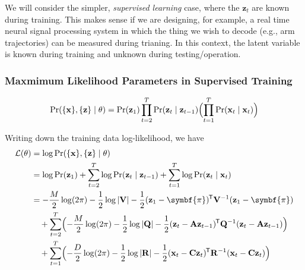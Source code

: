\documentclass[11pt]{article}
\newcommand{\logdet}[1]{\log \left| {#1} \right| }
\newcommand{\xb}{\mathbf{x}}
\newcommand{\zb}{\mathbf{z}}
\newcommand{\Ab}{\mathbf{A}}
\newcommand{\Qb}{\mathbf{Q}}
\newcommand{\Cb}{\mathbf{C}}
\newcommand{\Rb}{\mathbf{R}}
\newcommand*{\tran}{^{\mkern-1.5mu\mathsf{T}}}
\begin{document}
We will consider the simpler, \textit{supervised learning} case, where the
$\zb_t$ are known during training. This makes sense if we are designing, for
example, a real time neural signal processing system in which the thing we wish
to decode (e.g., arm trajectories) can be measured during trianing. In this
context, the latent variable is known during training and unknown during
testing/operation.

\subsubsection{Maxmimum Likelihood Parameters in Supervised Training}
\begin{equation*}
  \Pr(\{\xb\}, \{\zb\} \mid \theta) = \Pr(\zb_1)
    \prod_{t=2}^T \Pr(\zb_t \mid \zb_{t-1})
    \Bigl(\prod_{t=1}^T \Pr(\xb_t \mid \xb_t)\Bigr)
\end{equation*}

Writing down the training data log-likelihood, we have
\begin{align*}
  \mathcal{L}(\theta) &= \log \Pr(\{\xb\}, \{\zb\} \mid \theta) \\
  &= \log \Pr(\zb_1) +
    \sum_{t=2}^T \log \Pr(\zb_t \mid \zb_{t-1}) +
    \sum_{t=1}^T \log \Pr(\zb_t \mid \xb_t) \\
  &= - \frac{M}{2} \log(2 \pi) - \frac{1}{2} \logdet{\mathbf{V}}
       - \frac{1}{2} (\zb_1 - \symbf{\pi})\tran \mathbf{V}^{-1} (\zb_1 - \symbf{\pi}) \\
  &\quad
     + \sum_{t=2}^T \Bigl(-\frac{M}{2} \log(2 \pi) - \frac{1}{2} \logdet{\Qb}
       -\frac{1}{2} (\zb_t - \Ab\zb_{t-1})\tran \Qb^{-1} (\zb_t - \Ab\zb_{t-1})
       \Bigr)\\
&\quad
     + \sum_{t=1}^T \Bigl(-\frac{D}{2} \log(2 \pi) - \frac{1}{2} \logdet{\Rb}
       -\frac{1}{2} (\xb_t - \Cb\zb_t)\tran \Rb^{-1} (\xb_t - \Cb\zb_t) \Bigr)
\end{align*}
\end{document}
